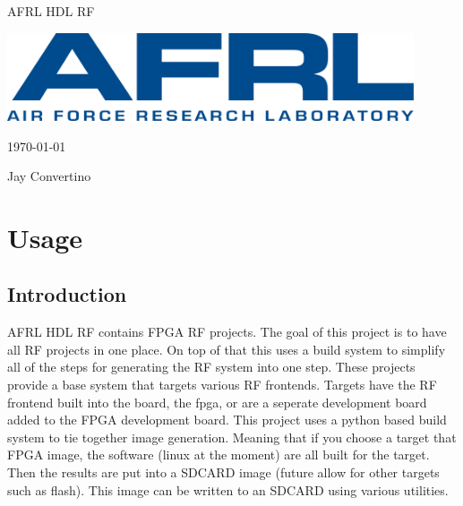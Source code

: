 \begin{titlepage}
  \begin{center}

  {\Huge AFRL HDL RF}

  \vspace{25mm}

  \includegraphics[width=0.90\textwidth,height=\textheight,keepaspectratio]{img/AFRL.png}

  \vspace{25mm}

  \today

  \vspace{15mm}

  {\Large Jay Convertino}

  \end{center}
\end{titlepage}

\tableofcontents

\newpage

\section{Usage}

\subsection{Introduction}

\par
AFRL HDL RF contains FPGA RF projects. The goal of this project is to have all RF projects in one place. On top of that this uses a build system
to simplify all of the steps for generating the RF system into one step. These projects provide a base system that targets various RF frontends.
Targets have the RF frontend built into the board, the fpga, or are a seperate development board added to the FPGA development board.
This project uses a python based build system to tie together image generation. Meaning that if you choose a target that FPGA image,
the software (linux at the moment) are all built for the target. Then the results are put into a SDCARD image (future allow for other targets such as flash).
This image can be written to an SDCARD using various utilities.

